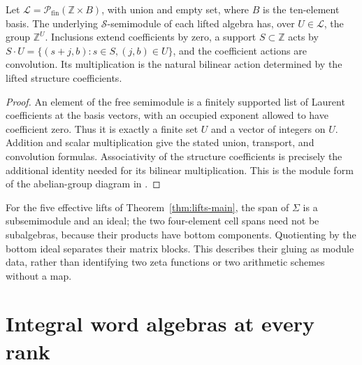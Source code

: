 \documentclass[11pt]{article}
\newcommand{\Z}{\mathbb Z}\newcommand{\N}{\mathbb N}\newcommand{\Q}{\mathbb Q}
\theoremstyle{definition}\newtheorem{definition}[theorem]{Definition}
\begin{document}








\begin{proposition}\label{prop:semimodule}
Let $\mathcal L=\mathcal P_{\mathrm{fin}}(\Z\times B)$, with union and empty set, where $B$ is the ten-element basis. The underlying $\mathcal S$-semimodule of each lifted algebra has, over $U\in\mathcal L$, the group $\Z^U$. Inclusions extend coefficients by zero, a support $S\subset\Z$ acts by $S\cdot U=\{(s+j,b):s\in S,(j,b)\in U\}$, and the coefficient actions are convolution. Its multiplication is the natural bilinear action determined by the lifted structure coefficients.
\end{proposition}
\begin{proof}
An element of the free semimodule is a finitely supported list of Laurent coefficients at the basis vectors, with an occupied exponent allowed to have coefficient zero. Thus it is exactly a finite set $U$ and a vector of integers on $U$. Addition and scalar multiplication give the stated union, transport, and convolution formulas. Associativity of the structure coefficients is precisely the additional identity needed for its bilinear multiplication. This is the module form of the abelian-group diagram in \citet[Theorem 8.5]{CFMM}.
\end{proof}

For the five effective lifts of Theorem~\ref{thm:lifts-main}, the span of $\Sigma$ is a subsemimodule and an ideal; the two four-element cell spans need not be subalgebras, because their products have bottom components. Quotienting by the bottom ideal separates their matrix blocks. This describes their gluing as module data, rather than identifying two zeta functions or two arithmetic schemes without a map.




\section{Integral word algebras at every rank}


\end{document}
